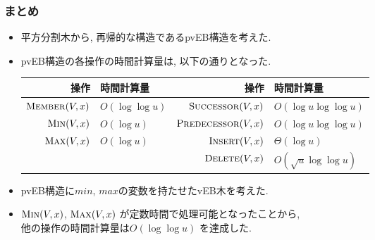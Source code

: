 \documentclass[dvipdfmx,12pt]{standalone}
\begin{document}
\begin{frame}\frametitle{まとめ}
	\begin{itemize}
		\item 平方分割木から, 再帰的な構造であるpvEB構造を考えた.\\
		\item pvEB構造の各操作の時間計算量は, 以下の通りとなった. \\
			\begin{tabular}{|r|l|r|l|}\hline
				操作 & 時間計算量 & 操作 & 時間計算量 \\\hline
				$\mathrm{\text{M\textsc{ember}}}(V,x)$ & $O(\log \log u)$ & $\mathrm{\text{S\textsc{uccessor}}}(V,x)$ & $O(\log u\log \log u)$ \\
				$\mathrm{\text{M\textsc{in}}}(V,x)$    & $O(\log u)$ 	 & $\mathrm{\text{P\textsc{redecessor}}}(V,x)$ & $O(\log u\log \log u)$ \\
				$\mathrm{\text{M\textsc{ax}}}(V,x)$	   & $O(\log u)$	 & $\mathrm{\text{I\textsc{nsert}}}(V,x)$	& $\Theta(\log u)$ \\
							   &					 & $\mathrm{\text{D\textsc{elete}}}(V,x)$	& $O(\sqrt{u}\log \log u)$\\\hline
			\end{tabular}
	\end{itemize}
	\begin{itemize}
		\item pvEB構造に$min$, $max$の変数を持たせたvEB木を考えた. \\
		\item $\mathrm{\text{M\textsc{in}}}(V,x)$, $\mathrm{\text{M\textsc{ax}}}(V,x)$ が定数時間で処理可能となったことから, \\
			他の操作の時間計算量は$O(\log \log u)$ を達成した. \\
	\end{itemize}
\end{frame}
\end{document}
